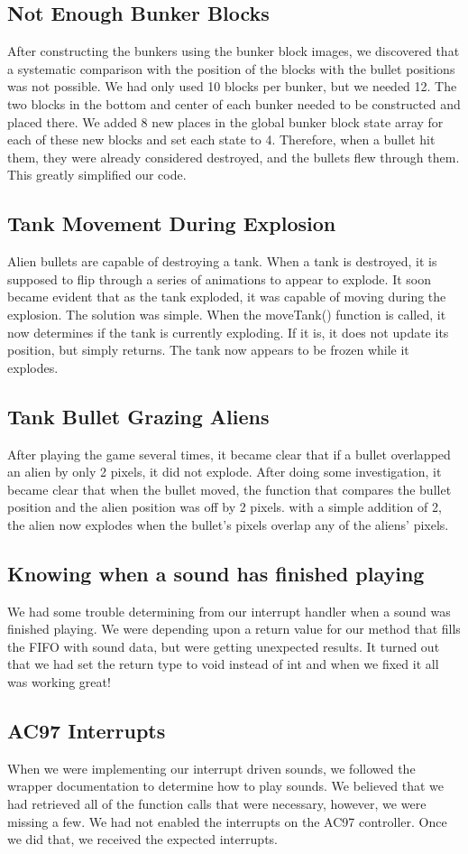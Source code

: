 \documentclass[11pt,letter,oneside]{report}
\begin{document}
\subsection{Not Enough Bunker Blocks}
After constructing the bunkers using the bunker block images, we discovered that a systematic comparison with the position of the blocks with the bullet positions was not possible. We had only used 10 blocks per bunker, but we needed 12. The two blocks in the bottom and center of each bunker needed to be constructed and placed there. We added 8 new places in the global bunker block state array for each of these new blocks and set each state to 4. Therefore, when a bullet hit them, they were already considered destroyed, and the bullets flew through them. This greatly simplified our code.

\subsection{Tank Movement During Explosion}
Alien bullets are capable of destroying a tank. When a tank is destroyed, it is supposed to flip through a series of animations to appear to explode. It soon became evident that as the tank exploded, it was capable of moving during the explosion. The solution was simple. When the moveTank() function is called, it now determines if the tank is currently exploding. If it is, it does not update its position, but simply returns. The tank now appears to be frozen while it explodes.

\subsection{Tank Bullet Grazing Aliens}
After playing the game several times, it became clear that if a bullet overlapped an alien by only 2 pixels, it did not explode. After doing some investigation, it became clear that when the bullet moved, the function that compares the bullet position and the alien position was off by 2 pixels. with a simple addition of 2, the alien now explodes when the bullet's pixels overlap any of the aliens' pixels.

\subsection{Knowing when a sound has finished playing}
We had some trouble determining from our interrupt handler when a sound was finished playing.  We were depending upon a return value for our method that fills the FIFO with sound data, but were getting unexpected results.  It turned out that we had set the return type to void instead of int and when we fixed it all was working great!

\subsection{AC97 Interrupts}
When we were implementing our interrupt driven sounds, we followed the wrapper documentation to determine how to play sounds. We believed that we had retrieved all of the function calls that were necessary, however, we were missing a few. We had not enabled the interrupts on the AC97 controller. Once we did that, we received the expected interrupts.
\end{document}
